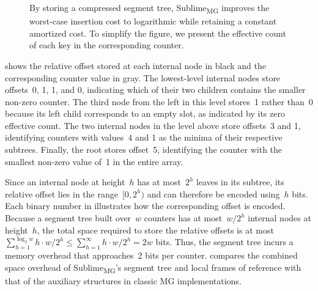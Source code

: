 \documentclass[sigconf]{acmart}
\newcommand{\sketch}{Sublime}
\newcommand{\sketchmg}{\sketch\textsubscript{MG}\xspace}
\begin{document}
\begin{figure}
    \caption{By storing a compressed segment tree, \sketchmg improves the worst-case insertion cost to logarithmic while retaining a constant amortized cost.
    To simplify the figure, we present the effective count of each key in the corresponding counter.}
    \label{fig:mg_segment_tree}
\end{figure}

 shows the relative offset stored at each internal node in black and the corresponding counter value in gray.
The lowest-level internal nodes store offsets~0, 1, 1, and 0, indicating which of their two children contains the smaller non-zero counter.
The third node from the left in this level stores~1 rather than~0 because its left child corresponds to an empty slot, as indicated by its zero effective count.
The two internal nodes in the level above store offsets~3 and 1, identifying counters with values~4 and 1 as the minima of their respective subtrees.
Finally, the root stores offset~5, identifying the counter with the smallest non-zero value of~1 in the entire array.

Since an internal node at height~$h$ has at most~$2^h$ leaves in its subtree, its relative offset lies in the range~$[0,2^h)$ and can therefore be encoded using~$h$ bits.
Each binary number in  illustrates how the corresponding offset is encoded.
Because a segment tree built over~$w$ counters has at most~$w/2^h$ internal nodes at height~$h$, the total space required to store the relative offsets is at most~$\sum_{h=1}^{\log_2 w} h \cdot w/2^h \leq \sum_{h=1}^{\infty} h \cdot w/2^h = 2w$ bits.
Thus, the segment tree incurs a memory overhead that approaches~2 bits per counter.
 compares the combined space overhead of \sketchmg's segment tree and local frames of reference with that of the auxiliary structures in classic MG implementations.
\end{document}
